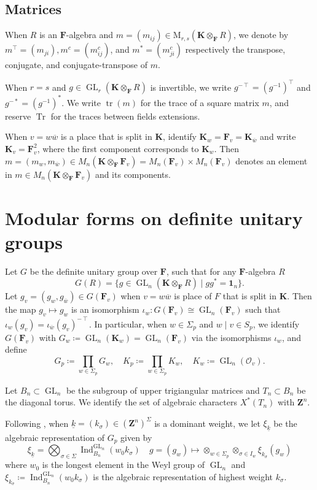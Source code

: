 \documentclass[leqno]{amsart}
\newcommand{\wt}[1]{\underline{ #1 }}
\newcommand{\bw}{\overline{w}}
\DeclareMathOperator{\GL}{GL}
\DeclareMathOperator{\mtr}{tr}
\newcommand{\id}{\mathbf{1}}
\newcommand{\Z}{{\mathbf{Z}}}
\DeclareMathOperator{\Tr}{Tr} %
\newcommand{\F}{{\mathbf{F}}} %
\newcommand{\K}{{\mathbf{K}}} %
\newcommand{\oo}{\mathcal{O}} %
\DeclareMathOperator{\Ind}{Ind}
\theoremstyle{definition}
\theoremstyle{remark}
\begin{document}
\subsection{Matrices}
When $R$ is an $\F$-algebra and 
$m=(m_{ij})\in \text{M}_{r,s}(\K\otimes_\F R)$,
we denote by 
$m^\intercal=(m_{ji}), 
m^c=(m^c_{ij})$, and
$m^*=(m^c_{ji})$
respectively the transpose, conjugate, and conjugate-transpose of $m$.

When $r=s$ and $g\in \GL_r(\K\otimes_\F R)$ is invertible, we write
$g^{-\intercal}=(g^{-1})^\intercal$ and $g^{-*}=(g^{-1})^*$.
We write $\mtr(m)$ for the trace of a square matrix $m$,
and reserve $\Tr$ for the traces between fields extensions.

When $v=w\bw$ is a place that is split in $\K$,
identify $\K_w=\F_v=\K_{\bw}$ and 
write $\K_v=\F_v^2$, 
where the first component corresponds to $\K_w$.
Then $m=(m_w,m_{\bw})\in M_n(\K\otimes_\F\F_v)=M_n(\F_v)\times M_n(\F_v)$ 
denotes an element in $m\in M_n(\K\otimes_\F\F_v)$ and its components.


\section{Modular forms on definite unitary groups}

Let $G$ be the definite unitary group over $\F$,
such that for any $\F$-algebra $R$
\[
    G(R)=\{g\in \GL_{n}(\K\otimes_\F R) \mid gg^*=\id_n\}.
\]
Let $g_v=(g_w,g_{\bw})\in G(\F_v)$
when $v=w\bw$ is place of $F$ that is split in $\K$.
Then the map $g_v\mapsto g_w$ is an isomorphism
$\iota_w\colon G(\F_v)\cong \GL_n(\F_v)$
such that 
$\iota_w(g_v)=\iota_{\bw}(g_v)^{-\intercal}$.
In particular, when $w\in \Sigma_p$ and  $w\mid v\in S_p$,
we identify $G(\F_v)$ with 
$G_{w}\coloneqq\GL_n(\K_w)=\GL_n(\F_v)$ 
via the isomorphisms $\iota_w$, and define 
\[
	G_p\coloneqq\prod_{w\in \Sigma_p}G_w,\quad
	K_p\coloneqq\prod_{w\in \Sigma_p}K_w,\quad
	K_w\coloneqq\GL_n(\oo_v).
\]

Let $B_n\subset \GL_n$ be the subgroup of
upper trigiangular matrices
and $T_n\subset B_n$ be the diagonal torus.
We identify the set of algebraic characters $X^*(T_n)$
with  $\Z^n$.



Following \cite[Defn 2.3]{ger},
when $\wt{k}=(k_\sigma)\in (\Z^n)^{\Sigma}$ 
is a dominant weight, 
we let $\xi_{\wt{k}}$ be the algebraic representation 
of $G_p$ given by 
\[
	\xi_{\wt{k}}=\bigotimes_{\sigma\in \Sigma}
	\Ind_{B_n}^{\GL_n}(w_0k_{\sigma})\quad
	g=(g_w)\mapsto 
	\otimes_{w\in \Sigma_p}
	\otimes_{\sigma\in I_w}\xi_{k_\sigma}(g_w)
\]
where $w_0$ is the longest element in the Weyl group of
$\GL_n$ and  
$\xi_{k_\sigma}\coloneqq\Ind_{B_n}^{\GL_n}(w_0k_{\sigma})$
is the algebraic representation of highest weight $k_\sigma$.
\end{document}
